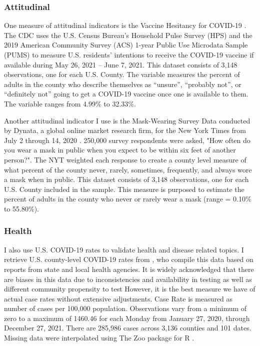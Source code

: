 \subsubsection{Attitudinal}




One measure of attitudinal indicators is the Vaccine Hesitancy for COVID-19
\citep{vaches_data}. The CDC uses the U.S. Census Bureau’s Household Pulse Survey
(HPS) and the 2019 American Community Survey (ACS) 1-year Public Use Microdata
Sample (PUMS) to measure U.S. residents’ intentions to receive the COVID-19
vaccine if available during May 26, 2021 – June 7, 2021. This dataset consists
of 3,148 observations, one for each U.S. County. The variable
measures the percent of adults in the county who describe themselves as
“unsure”, “probably not”, or “definitely not” going to get a COVID-19 vaccine
once one is available to them. The variable ranges from 4.99\% to 32.33\%. 

Another attitudinal indicator I use is the Mask-Wearing Survey Data conducted by
Dynata, a global online market research firm, for the New York Times from 
July 2 through 14, 2020 \citep{mask_data}. 250,000
survey respondents were asked, "How often do you wear a mask in public when you
expect to be within six feet of another person?". The NYT weighted each response
to create a county level measure of what percent of the county never, rarely,
sometimes, frequently, and always wore a mask when in public. This dataset
consists of 3,148 observations, one for each U.S. County included in the sample. This measure
is purposed to estimate the percent of adults in the county who never or rarely wear a mask
(range = 0.10\% to 55.80\%).

\subsubsection{Health}

I also use U.S. COVID-19 rates to validate health and disease related topics. I
retrieve U.S. county-level COVID-19 rates from \citet{covid_data}, who compile this
data based on reports from state and local health agencies. It is widely
acknowledged that there are biases in this data due to inconsistencies and
availability in testing as well as different community propensity to test
\citep{gu22, cdc20a} However, it is the best measure we have of actual case rates
without extensive adjustments.
Case Rate is measured as number of cases per 100,000 population. Observations
vary from a minimum of zero to a maximum of 1460.46 for each Monday from January 27, 2020, through
December 27, 2021. There are 285,986 cases across 3,136 counties and 101
dates. Missing data were interpolated using The Zoo package for R \citep{zoo}.

